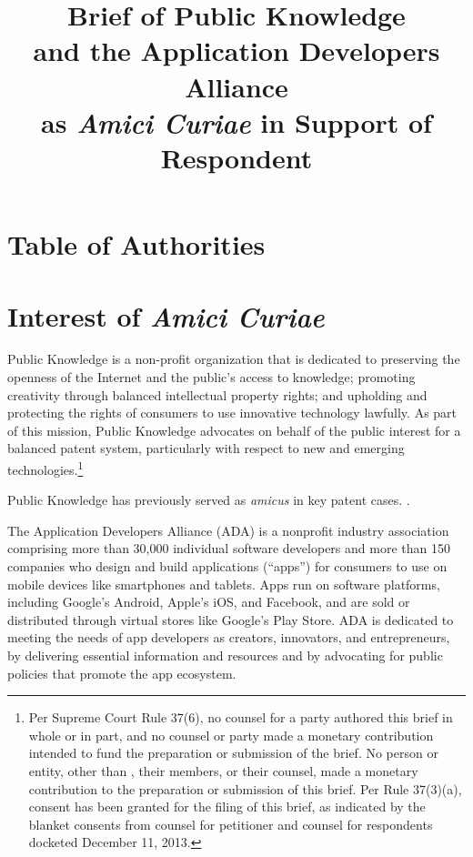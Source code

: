 \documentclass{scotus}
\title{Brief of Public Knowledge \protect\\
and the Application Developers Alliance \protect\\
as \emph{Amici Curiae} in Support of Respondent}
\begin{document}
\maketitle

\romanpagenumbers
\tableofcontents

\part{Table of Authorities}

\tableofauthorities

\clearpage
\arabicpagenumbers

\part{Interest of \emph{Amici Curiae}}

Public Knowledge is a non-profit organization that is dedicated to preserving
the openness of the Internet and the public's access to knowledge; promoting
creativity through balanced intellectual property rights; and upholding and
protecting the rights of consumers to use innovative technology lawfully. As
part of this mission, Public Knowledge advocates on behalf of the public
interest for a balanced patent system, particularly with respect to new and
emerging technologies.\footnote{Per Supreme Court Rule 37(6), no counsel for a
party authored this brief in whole or in part, and no counsel or party made a
monetary contribution intended to fund the preparation or submission of the
brief. No person or entity, other than \amici, their members, or their counsel,
made a monetary contribution to the preparation or submission of this brief. Per
Rule 37(3)(a), consent has been granted for the filing of this brief, as
indicated by the blanket consents from counsel for petitioner and counsel for
respondents docketed December 11, 2013.}

Public Knowledge has previously served as \emph{amicus} in key patent cases.
.

The Application Developers Alliance (ADA) is a nonprofit industry association
comprising more than 30,000 individual software developers and more than 150
companies who design and build applications (“apps”) for consumers to use on
mobile devices like smartphones and tablets. Apps run on software platforms,
including Google’s Android, Apple’s iOS, and Facebook, and are sold or
distributed through virtual stores like Google’s Play Store. ADA is dedicated to
meeting the needs of app developers as creators, innovators, and entrepreneurs,
by delivering essential information and resources and by advocating for public
policies that promote the app ecosystem.
\end{document}
